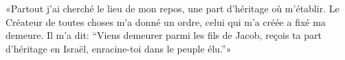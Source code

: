 «Partout j’ai cherché le lieu de mon repos,
    une part d’héritage où m’établir.
Le Créateur de toutes choses m’a donné un ordre,
    celui qui m’a créée a fixé ma demeure.
Il m’a dit: “Viens demeurer parmi les fils de Jacob,
    reçois ta part d’héritage en Israël, enracine-toi dans le peuple élu.”»
